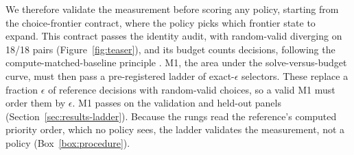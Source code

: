 We therefore validate the measurement before scoring any policy, starting from the choice-frontier contract, where the policy picks which frontier state to expand.
This contract passes the identity audit, with random-valid diverging on 18/18 pairs (Figure~\ref{fig:teaser}), and its budget counts decisions, following the compute-matched-baseline principle \citep{li2019random}.
M1, the area under the solve-versus-budget curve, must then pass a pre-registered ladder of exact-$\epsilon$ selectors.
These replace a fraction $\epsilon$ of reference decisions with random-valid choices, so a valid M1 must order them by $\epsilon$.
M1 passes on the validation and held-out panels (Section~\ref{sec:results-ladder}).
Because the rungs read the reference's computed priority order, which no policy sees, the ladder validates the measurement, not a policy (Box~\ref{box:procedure}).

